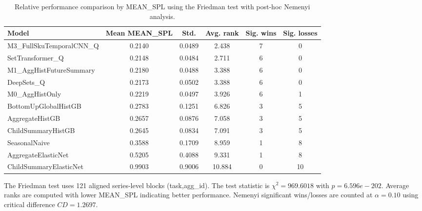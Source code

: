 \begin{table}[H]
\centering
\caption{Relative performance comparison by MEAN_SPL using the Friedman test with post-hoc Nemenyi analysis.}
\label{tab:stats_mean_spl}
\begin{threeparttable}
\begin{tabular}{lccccc}
\toprule
Model & Mean MEAN_SPL & Std. & Avg. rank & Sig. wins & Sig. losses \\
\midrule
M3\_FullSkuTemporalCNN\_Q & 0.2140 & 0.0489 & 2.438 & 7 & 0 \\
SetTransformer\_Q & 0.2148 & 0.0484 & 2.711 & 6 & 0 \\
M1\_AggHistFutureSummary & 0.2180 & 0.0488 & 3.388 & 6 & 0 \\
DeepSets\_Q & 0.2173 & 0.0502 & 3.388 & 6 & 0 \\
M0\_AggHistOnly & 0.2219 & 0.0497 & 3.926 & 6 & 1 \\
BottomUpGlobalHistGB & 0.2783 & 0.1251 & 6.826 & 3 & 5 \\
AggregateHistGB & 0.2657 & 0.0876 & 7.058 & 3 & 5 \\
ChildSummaryHistGB & 0.2645 & 0.0834 & 7.091 & 3 & 5 \\
SeasonalNaive & 0.3588 & 0.1709 & 8.959 & 1 & 8 \\
AggregateElasticNet & 0.5205 & 0.4088 & 9.331 & 1 & 8 \\
ChildSummaryElasticNet & 0.9903 & 0.9006 & 10.884 & 0 & 10 \\
\bottomrule
\end{tabular}
\begin{tablenotes}
\footnotesize \item The Friedman test uses 121 aligned series-level blocks (task,agg\_id). The test statistic is $\chi^2=969.6018$ with $p=6.596e-202$. Average ranks are computed with lower MEAN_SPL indicating better performance. Nemenyi significant wins/losses are counted at $\alpha=0.10$ using critical difference $CD=1.2697$.
\end{tablenotes}
\end{threeparttable}
\end{table}

